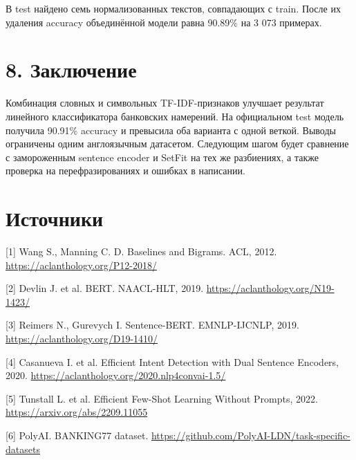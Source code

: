 \documentclass{article}
\begin{document}
В test найдено семь нормализованных текстов, совпадающих с train. После их удаления accuracy объединённой модели равна 90.89\% на 3 073 примерах.

\section*{8. Заключение}
Комбинация словных и символьных TF-IDF-признаков улучшает результат линейного классификатора банковских намерений. На официальном test модель получила 90.91\% accuracy и превысила оба варианта с одной веткой. Выводы ограничены одним англоязычным датасетом. Следующим шагом будет сравнение с замороженным sentence encoder и SetFit на тех же разбиениях, а также проверка на перефразированиях и ошибках в написании.

\section*{Источники}
[1] Wang S., Manning C. D. Baselines and Bigrams. ACL, 2012. \url{https://aclanthology.org/P12-2018/}

[2] Devlin J. et al. BERT. NAACL-HLT, 2019. \url{https://aclanthology.org/N19-1423/}

[3] Reimers N., Gurevych I. Sentence-BERT. EMNLP-IJCNLP, 2019. \url{https://aclanthology.org/D19-1410/}

[4] Casanueva I. et al. Efficient Intent Detection with Dual Sentence Encoders, 2020. \url{https://aclanthology.org/2020.nlp4convai-1.5/}

[5] Tunstall L. et al. Efficient Few-Shot Learning Without Prompts, 2022. \url{https://arxiv.org/abs/2209.11055}

[6] PolyAI. BANKING77 dataset. \url{https://github.com/PolyAI-LDN/task-specific-datasets}
\end{document}
